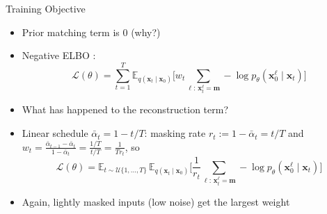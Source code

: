 \documentclass[11pt,compress,t,notes=noshow, xcolor=table]{beamer}
\providecommand{\bx}{\mathbf{x}}
\begin{document}
\begin{frame}{Training Objective}
 
\vfill
 
\begin{itemize}
\item Prior matching term is $0$ (why?)
\item Negative ELBO :
\begin{equation*}
\mathcal{L}(\theta) = \sum_{t=1}^{T} \mathbb{E}_{q(\bx_t \mid \bx_0)}\Big[w_t \sum_{\ell:\, \bx_t^\ell = \mathbf{m}} -\log p_\theta(\bx_0^\ell \mid \bx_t)\Big]
\end{equation*}
\item What has happened to the reconstruction term?
\item Linear schedule $\bar{\alpha}_t = 1 - t/T$: masking rate $r_t := 1 - \bar{\alpha}_t = t/T$ and $w_t = \frac{\bar{\alpha}_{t-1} - \bar{\alpha}_t}{1 - \bar{\alpha}_t} = \frac{1/T}{t/T} = \frac{1}{T r_t}$, so
\begin{equation*}
\mathcal{L}(\theta) = \mathbb{E}_{t \sim \mathcal{U}\{1, \dots, T\}}\, \mathbb{E}_{q(\bx_t \mid \bx_0)}\Big[\frac{1}{r_t} \sum_{\ell:\, \bx_t^\ell = \mathbf{m}} -\log p_\theta(\bx_0^\ell \mid \bx_t)\Big]
\end{equation*}
\item Again, lightly masked inputs (low noise) get the largest weight
\end{itemize}
 
\vfill
 
\end{frame}
\end{document}
